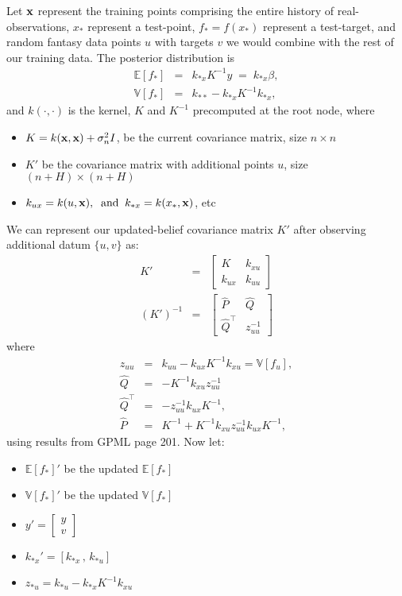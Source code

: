 \documentclass[a4paper,10pt]{article}
\newcommand{\inv}{^{-1}}
\newcommand{\E}{\mathbb{E}}
\newcommand{\V}{\mathbb{V}}
\newcommand{\x}{{\bf x}}
\begin{document}
Let $\x$ represent the training points comprising the entire history of real-observations,
$x_*$ represent a test-point, $f_* = f(x_*)$ represent a test-target,
and random fantasy data points $u$ with targets $v$
we would combine with the rest of our training data.
%
The posterior distribution is
\begin{eqnarray}
\E[f_*] & = & k_{*x}K\inv y \;=\; k_{*x}\beta, \\
\V[f_*] & = & k_{**} - k_{*x}K\inv k_{*x},
\end{eqnarray}
and
$k(\cdot,\cdot)$ is the kernel, %
$K$ and $K\inv $ precomputed at the root node,
where
\begin{itemize}
 \item $K = k(\x,\x) +\sigma_n^2 I$, be the current covariance matrix, size $n \times n$
 \item $K'$ be the covariance matrix with additional points $u$, size $(n+H) \times (n+H)$
 \item $k_{ux} = k(u,\x), \;\;\text{and}\;\; k_{*x} = k(x_*,\x)$, etc
\end{itemize}


\noindent
We can represent our updated-belief covariance matrix $K'$
after observing additional datum $\{u,v\}$ as:
\begin{eqnarray}
K' & = & \begin{bmatrix}
K & k_{xu} \\
k_{ux} & k_{uu}
\end{bmatrix} \\
%
(K')\inv  & = & \begin{bmatrix}
\hat{P} & \hat{Q} \\
\hat{Q}^{\top} & z_{uu}\inv
\end{bmatrix}
\end{eqnarray}
where
\begin{eqnarray}
z_{uu}         & = & k_{uu}-k_{ux}K\inv k_{xu} = \mathbb{V}[f_u], \\
\hat{Q}        & = & -K\inv k_{xu} z_{uu}\inv  \\
\hat{Q}^{\top} & = & -z_{uu}\inv k_{ux}K\inv , \\
\hat{P}        & = & K\inv  + K\inv k_{xu} z_{uu}\inv  k_{ux}K\inv ,
\end{eqnarray}
using results from GPML page 201.
Now let:
\begin{itemize}
 \item $\E[f_*]'$ be the updated $\E[f_*]$
 \item $\V[f_*]'$ be the updated $\V[f_*]$
 \item $y' = \begin{bmatrix} y \\ v \end{bmatrix}$
 \item $k_{*x}' = [k_{*x} \,,\, k_{*u}]$
 \item $z_{*u} = k_{*u} - k_{*x} K\inv k_{xu}$
\end{itemize}
\end{document}

